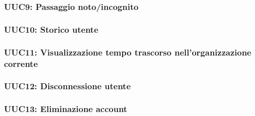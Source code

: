 \documentclass[../analisi-dei-requisiti.tex]{subfiles}
\begin{document}


\subsubsection{UUC9: Passaggio noto/incognito}%
\label{subs:UUC9}



\subsubsection{UUC10: Storico utente}%
\label{subs:UUC10}



\subsubsection{UUC11: Visualizzazione tempo trascorso nell'organizzazione corrente}%
\label{subs:UUC11}



\subsubsection{UUC12: Disconnessione utente}%
\label{subs:UUC12}



\subsubsection{UUC13: Eliminazione account}%
\label{subs:UUC13}


\end{document}
